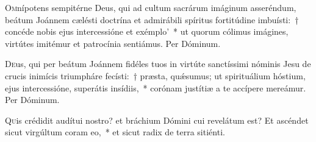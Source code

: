 \documentclass[vesperale_romanum.tex]{subfiles}
\begin{document}
\oratio

\lettrine{O}{m}nípotens sempitérne Deus, qui ad cultum sacrárum imáginum asseréndum, beátum Joánnem cælésti doctrína et admirábili spíritus fortitúdine imbuísti:~† concéde nobis ejus intercessióne et exémplo'~* ut quorum cólimus imágines, virtútes imitémur et patrocínia sentiámus.
Per Dóminum.

\commferiae


\myrule


\semiduplexmtv


\oratio

\lettrine{D}{e}us, qui per beátum Joánnem fidéles tuos in virtúte san\-ctíssimi nóminis Jesu de crucis inimícis triumpháre fecísti:~† præsta, quǽsumus; ut spirituálium hóstium, ejus intercessióne, superátis insídiis,~* corónam justítiæ a te accípere mereámur. Per Dóminum.

\commferiae

\myrule

\vspace{0.25\baselineskip}


\duplexmajus








\lettrine{Q}{u}is crédidit audítui nostro? et bráchium Dómini cui revelátum est? Et ascéndet sicut virgúltum coram eo,~* et sicut radix de terra sitiénti.
\end{document}
